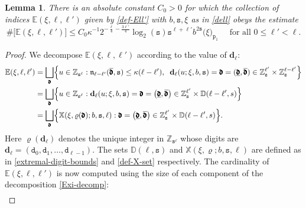 \documentclass[12pt, twoside]{article}
\newtheorem{lemma}[theorem]{Lemma}
\theoremstyle{definition}
\numberwithin{equation}{section}
\begin{document}
\begin{lemma} \label{E-cardinality-lemma}
There is an absolute constant $C_0 > 0$ for which the collection of indices $\mathbb E(\xi, \ell, \ell')$ given by \eqref{def-Ell'} with $b,\mathtt s,\xi$ as in \eqref{dell} obeys the estimate 
\begin{equation} \label{E-cardinality}
\# \bigl[\mathbb E(\xi, \ell, \ell') \bigr] \leq C_0 \kappa^{-1} 2^{-\frac{\ell}{4} - \frac{3 \ell'}{4}} \log_2(\mathtt s) \mathtt s^{\ell + \ell'} b^{2\mathtt s} \bigl(\xi \bigr)_{\mathtt p_1} \quad \text{ for all } 0 \leq \ell' < \ell.
\end{equation}
\end{lemma} 
\begin{proof} 
We decompose $\mathbb E(\xi, \ell, \ell')$ according to the value of $\mathbf d_{\ell}$:
\begin{align}
\mathbb E(\xi, \ell, \ell') &= \bigsqcup_{\pmb{\mathfrak d}} \Bigl\{u \in \mathbb Z_{\mathtt s^{\ell}} : \mathfrak n_{\ell - \ell'}(\overline{\pmb{\mathfrak d}}, \mathtt s) \leq \kappa (\ell - \ell'), \; \;  \mathbf d_{\ell}(u; \xi, b, \mathtt s) = \pmb{\mathfrak d} = (\underline{\pmb{\mathfrak d}}, \overline{\pmb{\mathfrak d}}) \in \mathbb Z_{\mathtt s}^{\ell'} \times \mathbb Z_{\mathtt s}^{\ell - \ell'} \Bigr\} \nonumber \\
&= \bigsqcup_{\pmb{\mathfrak d}} \Bigl\{u \in \mathbb Z_{\mathtt s^{\ell}} : {\mathbf d}_{\ell}(u; \xi, b, \mathtt s) = \pmb{\mathfrak d} =  \bigl(\underline{\pmb{\mathfrak d}}, \overline{\pmb{\mathfrak d}} \bigr)   \in  \mathbb Z_{\mathtt s}^{\ell'} \times \mathbb D(\ell - \ell', s) \Bigr\} \nonumber \\ 
&= \bigsqcup_{\pmb{\mathfrak d}} \Bigl\{ \mathbb X(\xi, \varrho(\pmb{\mathfrak d}); b, \mathtt s, \ell) : \pmb{\mathfrak d} =  \bigl(\underline{\pmb{\mathfrak d}}, \overline{\pmb{\mathfrak d}} \bigr)   \in  \mathbb Z_{\mathtt s}^{\ell'} \times \mathbb D(\ell - \ell', s) \Bigr\}. \label{Exi-decomp} 
\end{align}
Here $\varrho(\mathbf d_{\ell})$ denotes the unique integer in $\mathbb Z_{\mathtt s^{\ell}}$ whose digits are $\mathbf d_{\ell} = (\mathtt d_0, \mathtt d_1, \ldots, \mathtt d_{\ell-1})$. The sets $\mathbb D(\ell, \mathtt s)$ and $\mathbb X(\xi, \varrho; b, \mathtt s, \ell)$ are defined as in \eqref{extremal-digit-bounds} and \eqref{def-X-set} respectively. The cardinality of $\mathbb E(\xi, \ell, \ell')$ is now computed using the size of each component of the decomposition \eqref{Exi-decomp}:
\begin{align*}

\end{align*}
\end{proof}
\end{document}
